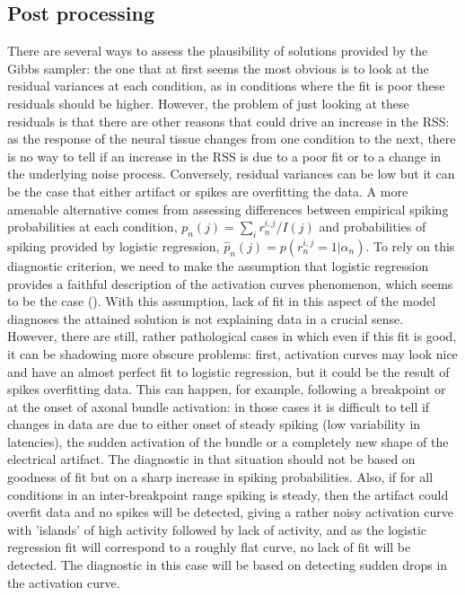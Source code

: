 \documentclass[12pt,letterpaper,fleqn]{article}
\begin{document}
\subsection{Post processing}
There are several ways to assess the plausibility of solutions provided by the Gibbs sampler: the one that at first seems the most obvious is to look at the residual variances at each condition, as in conditions where the fit is poor these residuals should be higher. However, the problem of just looking at these residuals is that there are other reasons that could drive an increase in the RSS: as the response of the neural tissue changes from one condition to the next, there is no way to tell if an increase in the RSS is due to a poor fit or to a change in the underlying noise process. Conversely, residual variances can be low but it can be the case that either artifact or spikes are overfitting the data. A more amenable alternative comes from assessing differences between empirical spiking probabilities at each condition, $p_n(j)=\sum_i r_n^{i,j}/I(j)$ and probabilities of spiking provided by logistic regression, $\hat{p}_n(j)=p(r_n^{i,j}=1|\alpha_n)$. To rely on this diagnostic criterion, we need to make the assumption that logistic regression provides a faithful description of the activation curves phenomenon, which seems to be the case (\cite{GrosbergEtal14}). With this assumption, lack of fit in this aspect of the model diagnoses the attained solution is not explaining data in a crucial sense. \\

However, there are still, rather pathological cases in which even if this fit is good, it can be shadowing more obscure problems: first, activation curves may look nice and have an almost perfect fit to logistic regression, but it could be the result of spikes overfitting data. This can happen, for example, following a breakpoint or at the onset of axonal bundle activation: in those cases it is difficult to tell if changes in data are due to either onset of steady spiking (low variability in latencies), the sudden activation of the bundle or a completely new shape of the electrical artifact. The diagnostic in that situation should not be based on goodness of fit but on a sharp increase in spiking probabilities. Also, if for all conditions in an inter-breakpoint range spiking is steady, then the artifact could overfit data and no spikes will be detected, giving a rather noisy activation curve with 'islands' of high activity followed by lack of activity, and as the logistic regression fit will correspond to a roughly flat curve, no lack of fit will be detected. The diagnostic in this case will be based on detecting sudden drops in the activation curve.\\
\end{document}
